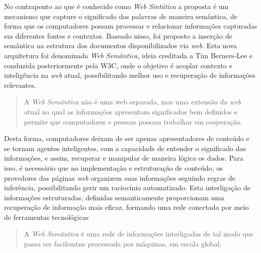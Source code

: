 No contraponto ao que é conhecido como \textit{Web Sintática}\cite{berners:2001} a proposta é um mecanismo que capture o significado das palavras de maneira semântica, de forma que os computadores possam processar e relacionar informações capturadas em diferentes fontes e contextos. Baseado nisso, foi proposto a inserção de semântica na estrutura dos documentos disponibilizados via \textit{web}\cite{breitman:2006}. Esta nova arquitetura foi denominada \textit{Web Semântica}, ideia creditada a Tim Berners-Lee e conduzida posteriormente pela W3C, onde o objetivo é acoplar contexto e inteligência na \textit{web} atual, possibilitando melhor uso e recuperação de informações relevantes\cite{souza:2004}.

\begin{quote}
A \textit{Web Semântica} não é uma web separada, mas uma extensão da \textit{web} atual na qual as informações apresentam significados bem definidos e permite que computadores e pessoas possam trabalhar em cooperação\cite{berners:2001}.
\end{quote}

Desta forma, computadores deixam de ser apenas apresentadores de conteúdo e se tornam agentes inteligentes, com a capacidade de entender o significado das informações, e assim, recuperar e manipular de maneira lógica os dados. Para isso, é necessário que na implementação e estruturação de conteúdo, os provedores das páginas \textit{web} organizem suas informações seguindo regras de inferência, possibilitando gerir um raciocínio automatizado\cite{berners:2001}. Esta interligação de informações estruturadas, definidas semanticamente proporcionam uma recuperação de informação mais eficaz, formando uma rede conectada por meio de ferramentas tecnológicas\cite{alves:2004}

\begin{quote}
A \textit{Web Semântica} é uma rede de informações interligadas de tal modo que possa ser facilemtne processada por máquinas, em escala global\cite{palmer:2009}.
\end{quote}


